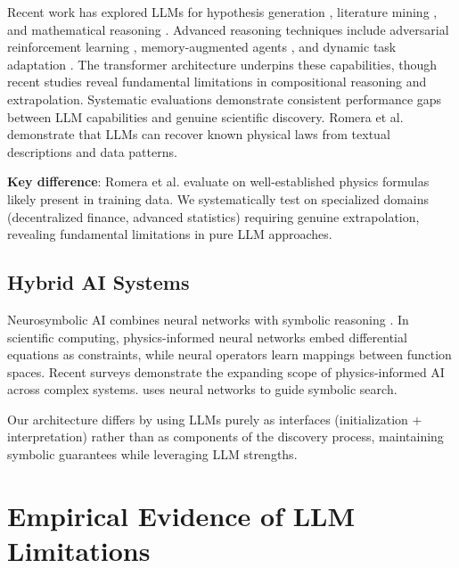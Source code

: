 \documentclass[twoside,11pt]{article}
\begin{document}
Recent work has explored LLMs for hypothesis generation \citep{wang2023scientific}, literature mining \citep{liu2023summary}, and mathematical reasoning \citep{wei2022chain,zhang2025survey}. Advanced reasoning techniques include adversarial reinforcement learning \citep{liu2025adversarial}, memory-augmented agents \citep{yan2026memory}, and dynamic task adaptation \citep{wang2025reasoning}. The transformer architecture \citep{vaswani2017attention} underpins these capabilities, though recent studies \citep{mirzadeh2024reasoning,dziri2023faith,xu2025fundamental,tian2025reasoning} reveal fundamental limitations in compositional reasoning and extrapolation. Systematic evaluations \citep{du2025evaluating,chen2025epistemic} demonstrate consistent performance gaps between LLM capabilities and genuine scientific discovery. Romera et al. \citep{romera2023discovering} demonstrate that LLMs can recover known physical laws from textual descriptions and data patterns.

\textbf{Key difference}: Romera et al. evaluate on well-established physics formulas likely present in training data. We systematically test on specialized domains (decentralized finance, advanced statistics) requiring genuine extrapolation, revealing fundamental limitations in pure LLM approaches\citep{kambhampati2024llms}.

\subsection{Hybrid AI Systems}

Neurosymbolic AI combines neural networks with symbolic reasoning \citep{garcez2019neural,kautz2020third}. In scientific computing, physics-informed neural networks \citep{raissi2019physics,karniadakis2021physics} embed differential equations as constraints, while neural operators \citep{lu2021learning,li2020fourier} learn mappings between function spaces. Recent surveys \citep{li2026physics} demonstrate the expanding scope of physics-informed AI across complex systems. \citet{udrescu2020ai} uses neural networks to guide symbolic search.

Our architecture differs by using LLMs purely as interfaces (initialization + interpretation) rather than as components of the discovery process, maintaining symbolic guarantees while leveraging LLM strengths\citep{koza1994genetic}\citep{kambhampati2024llms}.

\section{Empirical Evidence of LLM Limitations}\citep{kambhampati2024llms}
\label{sec:llm_limitations}
\end{document}
